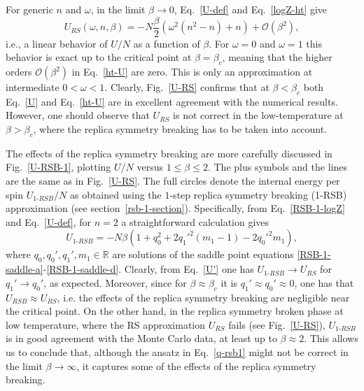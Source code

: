 \documentclass[twocolumn,superscriptaddress,prb,10pt]{revtex4-1}
\begin{document}
For generic $n$ and $\omega$, in the limit $\beta\to 0$, Eq.~\eqref{U-def} 
and Eq.~\eqref{logZ-ht} give  
%
\begin{equation}
U_{RS}(\omega,n,\beta)= -N\frac{\beta}{2}(\omega^2(n^2-n)+n)+{\mathcal O}(\beta^2), 
\label{ht-U}
\end{equation}
%
i.e., a linear behavior of $U/N$ as a function of $\beta$. For $\omega=0$ and $\omega=1$ 
this behavior is exact up to the critical point at $\beta=\beta_c$, meaning that the higher 
orders ${\mathcal O}(\beta^2)$ in Eq.~\eqref{ht-U} are zero. This is only an approximation at 
intermediate $0<\omega<1$. Clearly, Fig.~\ref{U-RS} confirms that at $\beta<\beta_c$ both 
Eq.~\eqref{U} and Eq.~\eqref{ht-U} are in excellent agreement with the numerical results. 
However, one should observe that $U_{RS}$ is not correct in the low-temperature at 
$\beta>\beta_c$, where the replica symmetry breaking has to be taken into account. 

The effects of the replica symmetry breaking are more carefully discussed in 
Fig.~\ref{U-RSB-1}, plotting $U/N$ versus $1\le\beta\le 2$. The plus symbols and the lines 
are the same as in Fig.~\ref{U-RS}.  The full circles denote the internal energy per spin 
$U_{1\textrm{-}RSB}/N$ as obtained using the $1$-step replica symmetry breaking (1-RSB) 
approximation (see section~\ref{rsb-1-section}). Specifically, from Eq.~\eqref{RSB-1-logZ} 
and Eq.~\eqref{U-def}, for $n=2$ a straightforward calculation gives 
%
\begin{equation}
U_{1\textrm{-}RSB}=-N\beta(1+q_0^2+2q_1'^2(m_1-1)-2q_0'^2m_1), 
\label{U'}
\end{equation}
%
where $q_0,q_0',q_1',m_1\in\mathbb{R}$ are solutions of the saddle point 
equations \eqref{RSB-1-saddle-a}-\eqref{RSB-1-saddle-d}. Clearly, from Eq.~\eqref{U'} 
one has $U_{1\textrm{-}RSB}\to U_{RS}$ for $q_1'\to q_0'$, as expected. 
Moreover, since for $\beta\approx\beta_c$ it is $q_1'\approx q_0'\approx0$, one has  
that $U_{RSB}\approx U_{RS}$, i.e. the effects of the replica symmetry breaking are 
negligible near the critical point. 
On the other hand, in the replica symmetry broken phase at low temperature, 
where the RS approximation $U_{RS}$ fails (see Fig.~\ref{U-RS}), $U_{1\textrm{-}RSB}$ 
is in good agreement with the Monte Carlo data, at least up to $\beta\approx 2$.  
This allows us to conclude that, although the ansatz in Eq.~\eqref{q-rsb1} 
might not be correct in the limit $\beta\to\infty$, it captures some of the effects 
of the replica symmetry breaking.  
\end{document}
